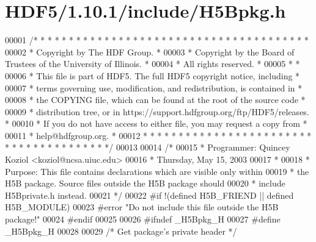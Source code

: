 \hypertarget{_h_d_f5_21_810_81_2include_2_h5_bpkg_8h_source}{}\section{H\+D\+F5/1.10.1/include/\+H5\+Bpkg.h}
\label{_h_d_f5_21_810_81_2include_2_h5_bpkg_8h_source}

\begin{DoxyCode}
00001 \textcolor{comment}{/* * * * * * * * * * * * * * * * * * * * * * * * * * * * * * * * * * * * * * *}
00002 \textcolor{comment}{ * Copyright by The HDF Group.                                               *}
00003 \textcolor{comment}{ * Copyright by the Board of Trustees of the University of Illinois.         *}
00004 \textcolor{comment}{ * All rights reserved.                                                      *}
00005 \textcolor{comment}{ *                                                                           *}
00006 \textcolor{comment}{ * This file is part of HDF5.  The full HDF5 copyright notice, including     *}
00007 \textcolor{comment}{ * terms governing use, modification, and redistribution, is contained in    *}
00008 \textcolor{comment}{ * the COPYING file, which can be found at the root of the source code       *}
00009 \textcolor{comment}{ * distribution tree, or in https://support.hdfgroup.org/ftp/HDF5/releases.  *}
00010 \textcolor{comment}{ * If you do not have access to either file, you may request a copy from     *}
00011 \textcolor{comment}{ * help@hdfgroup.org.                                                        *}
00012 \textcolor{comment}{ * * * * * * * * * * * * * * * * * * * * * * * * * * * * * * * * * * * * * * */}
00013 
00014 \textcolor{comment}{/*}
00015 \textcolor{comment}{ * Programmer:  Quincey Koziol <koziol@ncsa.uiuc.edu>}
00016 \textcolor{comment}{ *      Thursday, May 15, 2003}
00017 \textcolor{comment}{ *}
00018 \textcolor{comment}{ * Purpose: This file contains declarations which are visible only within}
00019 \textcolor{comment}{ *      the H5B package.  Source files outside the H5B package should}
00020 \textcolor{comment}{ *      include H5Bprivate.h instead.}
00021 \textcolor{comment}{ */}
00022 \textcolor{preprocessor}{#if !(defined H5B\_FRIEND || defined H5B\_MODULE)}
00023 \textcolor{preprocessor}{#error "Do not include this file outside the H5B package!"}
00024 \textcolor{preprocessor}{#endif}
00025 
00026 \textcolor{preprocessor}{#ifndef \_H5Bpkg\_H}
00027 \textcolor{preprocessor}{#define \_H5Bpkg\_H}
00028 
00029 \textcolor{comment}{/* Get package's private header */}

\end{DoxyCode}
